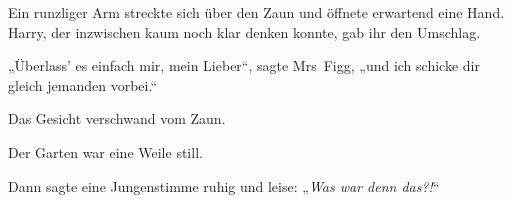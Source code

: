 Ein runzliger Arm streckte sich über den Zaun und öffnete erwartend eine Hand. Harry, der inzwischen kaum noch klar denken konnte, gab ihr den Umschlag.

„Überlass’ es einfach mir, mein Lieber“, sagte Mrs~Figg, „und ich schicke dir gleich jemanden vorbei.“

Das Gesicht verschwand vom Zaun.

Der Garten war eine Weile still.

Dann sagte eine Jungenstimme ruhig und leise: „\emph{Was war denn das?!}“
